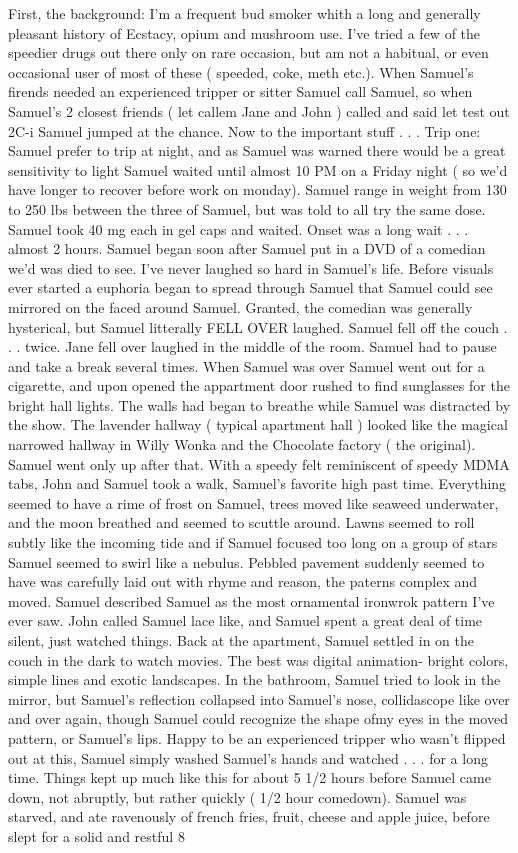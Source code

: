 \documentclass[12pt]{book}
\begin{document}
First, the background: I'm a frequent bud smoker whith a long and generally pleasant history of Ecstacy, opium and mushroom use. I've tried a few of the speedier drugs out there only on rare occasion, but am not a habitual, or even occasional user of most of these ( speeded, coke, meth etc.). When Samuel's firends needed an experienced tripper or sitter Samuel call Samuel, so when Samuel's 2 closest friends ( let callem Jane and John ) called and said let test out 2C-i Samuel jumped at the chance. Now to the important stuff . . .  Trip one: Samuel prefer to trip at night, and as Samuel was warned there would be a great sensitivity to light Samuel waited until almost 10 PM on a Friday night ( so we'd have longer to recover before work on monday). Samuel range in weight from 130 to 250 lbs between the three of Samuel, but was told to all try the same dose. Samuel took 40 mg each in gel caps and waited. Onset was a long wait . . .  almost 2 hours. Samuel began soon after Samuel put in a DVD of a comedian we'd was died to see. I've never laughed so hard in Samuel's life. Before visuals ever started a euphoria began to spread through Samuel that Samuel could see mirrored on the faced around Samuel. Granted, the comedian was generally hysterical, but Samuel litterally FELL OVER laughed. Samuel fell off the couch . . .  twice. Jane fell over laughed in the middle of the room. Samuel had to pause and take a break several times. When Samuel was over Samuel went out for a cigarette, and upon opened the appartment door rushed to find sunglasses for the bright hall lights. The walls had began to breathe while Samuel was distracted by the show. The lavender hallway ( typical apartment hall ) looked like the magical narrowed hallway in Willy Wonka and the Chocolate factory ( the original). Samuel went only up after that. With a speedy felt reminiscent of speedy MDMA tabs, John and Samuel took a walk, Samuel's favorite high past time. Everything seemed to have a rime of frost on Samuel, trees moved like seaweed underwater, and the moon breathed and seemed to scuttle around. Lawns seemed to roll subtly like the incoming tide and if Samuel focused too long on a group of stars Samuel seemed to swirl like a nebulus. Pebbled pavement suddenly seemed to have was carefully laid out with rhyme and reason, the paterns complex and moved. Samuel described Samuel as the most ornamental ironwrok pattern I've ever saw. John called Samuel lace like, and Samuel spent a great deal of time silent, just watched things. Back at the apartment, Samuel settled in on the couch in the dark to watch movies. The best was digital animation- bright colors, simple lines and exotic landscapes. In the bathroom, Samuel tried to look in the mirror, but Samuel's reflection collapsed into Samuel's nose, collidascope like over and over again, though Samuel could recognize the shape ofmy eyes in the moved pattern, or Samuel's lips. Happy to be an experienced tripper who wasn't flipped out at this, Samuel simply washed Samuel's hands and watched . . .  for a long time. Things kept up much like this for about 5 1/2 hours before Samuel came down, not abruptly, but rather quickly ( 1/2 hour comedown). Samuel was starved, and ate ravenously of french fries, fruit, cheese and apple juice, before slept for a solid and restful 8 
\end{document}
